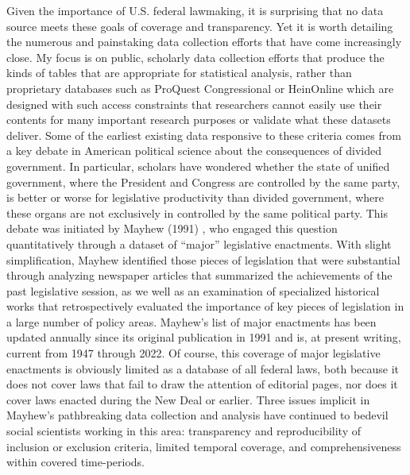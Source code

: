 \documentclass[fleqn,10pt]{wlscirep}
\begin{document}
 Given the importance of U.S. federal lawmaking, it is surprising that no data source meets these goals of coverage and transparency. Yet it is worth detailing the numerous and painstaking data collection efforts that have come increasingly close. My focus is on public, scholarly data collection efforts that produce the kinds of tables that are appropriate for statistical analysis, rather than proprietary databases such as ProQuest Congressional or HeinOnline which are designed with such access constraints that researchers cannot easily use their contents for many important research purposes or validate what these datasets deliver. Some of the earliest existing data responsive to these criteria comes from a key debate in American political science about the consequences of divided government. In particular, scholars have wondered whether the state of unified government, where the President and Congress are controlled by the same party, is better or worse for legislative productivity than divided government, where these organs are not exclusively in controlled by the same political party. This debate was initiated by Mayhew (1991) \nocite{Mayhew1991}, who engaged this question quantitatively through a dataset of ``major'' legislative enactments. With slight simplification, Mayhew identified those pieces of legislation that were substantial through analyzing newspaper articles that summarized the achievements of the past legislative session, as we well as an examination of specialized historical works that retrospectively evaluated the importance of key pieces of legislation in a large number of policy areas. Mayhew's list of major enactments has been updated annually since its original publication in 1991 and is, at present writing, current from 1947 through 2022. Of course, this coverage of major legislative enactments is obviously limited as a database of all federal laws, both because it does not cover laws that fail to draw the attention of editorial pages, nor does it cover laws enacted during the New Deal or earlier.  Three issues implicit in Mayhew's pathbreaking data collection and analysis have continued to bedevil social scientists working in this area: transparency and reproducibility of inclusion or exclusion criteria, limited temporal coverage, and comprehensiveness within covered time-periods.
\end{document}
